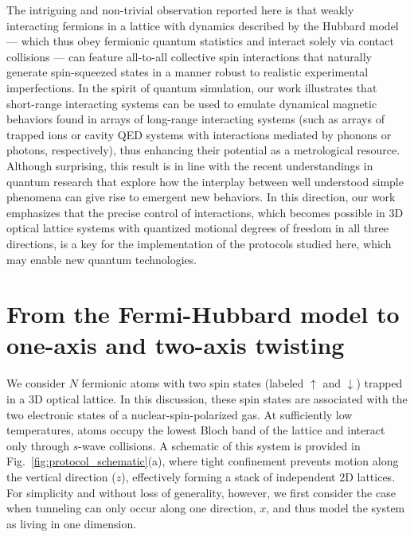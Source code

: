 \documentclass[aps,prx,superscriptaddress,notitlepage,twocolumn,longbibliography]{revtex4-1}
\newcommand{\up}{\uparrow}
\newcommand{\dn}{\downarrow}
\begin{document}
The intriguing and non-trivial observation reported here is that weakly interacting fermions in a lattice with dynamics described by the Hubbard model --- which thus obey fermionic quantum statistics and interact solely via contact collisions --- can feature all-to-all collective spin interactions that naturally generate spin-squeezed states in a manner robust to realistic experimental imperfections.
In the spirit of quantum simulation, our work illustrates that short-range interacting systems can be used to emulate  dynamical magnetic behaviors found in arrays of long-range interacting systems (such as arrays of trapped ions\cite{Bohnet2016} or cavity QED systems\cite{Monika2010,norcia2018cavitymediated} with interactions mediated by phonons or photons, respectively), thus enhancing their potential as a metrological resource.
Although surprising, this result is in line with the recent understandings in quantum research that explore how the interplay between well understood simple phenomena can give rise to emergent new  behaviors.
In this direction, our work emphasizes that the precise control of interactions, which becomes possible in 3D optical lattice systems with quantized motional degrees of freedom in all three directions, is a key for the implementation of the protocols studied here, which may enable new quantum technologies.


\section{From the Fermi-Hubbard model to one-axis and two-axis twisting}
\label{sec:theory}

We consider $N$ fermionic atoms with two spin states (labeled $\up$ and $\dn$) trapped in a 3D optical lattice.
In this discussion, these spin states are associated with the two electronic states of a nuclear-spin-polarized gas.
At sufficiently low temperatures, atoms  occupy the lowest Bloch band of the lattice and interact only through $s$-wave collisions.
A schematic of this system is provided in Fig.~\ref{fig:protocol_schematic}(a), where tight confinement prevents motion along the vertical direction ($z$), effectively forming a stack of independent 2D lattices.
For simplicity and without loss of generality, however, we first consider the case when tunneling can only occur along one direction, $x$, and thus model the system as living in  one dimension.
\end{document}
